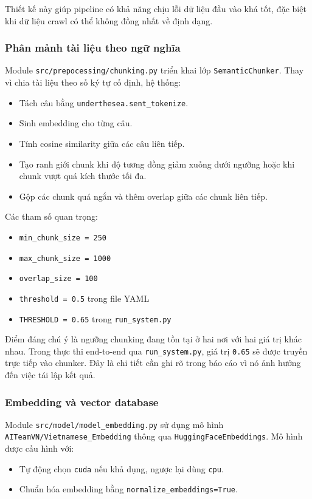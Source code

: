 \documentclass[12pt,a4paper]{article}
\begin{document}
Thiết kế này giúp pipeline có khả năng chịu lỗi dữ liệu đầu vào khá tốt, đặc biệt khi dữ liệu crawl có thể không đồng nhất về định dạng.

\subsubsection{Phân mảnh tài liệu theo ngữ nghĩa}

Module \texttt{src/prepocessing/chunking.py} triển khai lớp \texttt{SemanticChunker}. Thay vì chia tài liệu theo số ký tự cố định, hệ thống:
\begin{itemize}[leftmargin=1.5cm]
    \item Tách câu bằng \texttt{underthesea.sent\_tokenize}.
    \item Sinh embedding cho từng câu.
    \item Tính cosine similarity giữa các câu liên tiếp.
    \item Tạo ranh giới chunk khi độ tương đồng giảm xuống dưới ngưỡng hoặc khi chunk vượt quá kích thước tối đa.
    \item Gộp các chunk quá ngắn và thêm overlap giữa các chunk liên tiếp.
\end{itemize}

Các tham số quan trọng:
\begin{itemize}[leftmargin=1.5cm]
    \item \texttt{min\_chunk\_size = 250}
    \item \texttt{max\_chunk\_size = 1000}
    \item \texttt{overlap\_size = 100}
    \item \texttt{threshold = 0.5} trong file YAML
    \item \texttt{THRESHOLD = 0.65} trong \texttt{run\_system.py}
\end{itemize}

Điểm đáng chú ý là ngưỡng chunking đang tồn tại ở hai nơi với hai giá trị khác nhau. Trong thực thi end-to-end qua \texttt{run\_system.py}, giá trị \texttt{0.65} sẽ được truyền trực tiếp vào chunker. Đây là chi tiết cần ghi rõ trong báo cáo vì nó ảnh hưởng đến việc tái lập kết quả.

\subsubsection{Embedding và vector database}

Module \texttt{src/model/model\_embedding.py} sử dụng mô hình \texttt{AITeamVN/Vietnamese\_Embedding} thông qua \texttt{HuggingFaceEmbeddings}. Mô hình được cấu hình với:
\begin{itemize}[leftmargin=1.5cm]
    \item Tự động chọn \texttt{cuda} nếu khả dụng, ngược lại dùng \texttt{cpu}.
    \item Chuẩn hóa embedding bằng \texttt{normalize\_embeddings=True}.
\end{itemize}
\end{document}
